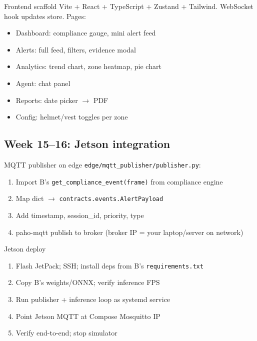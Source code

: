 \documentclass[12pt,a4paper]{report}
\begin{document}
\begin{stepbox}{Frontend scaffold}
Vite + React + TypeScript + Zustand + Tailwind. WebSocket hook updates store. Pages:
\begin{itemize}
    \item Dashboard: compliance gauge, mini alert feed
    \item Alerts: full feed, filters, evidence modal
    \item Analytics: trend chart, zone heatmap, pie chart
    \item Agent: chat panel
    \item Reports: date picker $\rightarrow$ PDF
    \item Config: helmet/vest toggles per zone
\end{itemize}
\end{stepbox}

\subsection{Week 15--16: Jetson integration}

\begin{stepbox}{MQTT publisher on edge}
\texttt{edge/mqtt\_publisher/publisher.py}:
\begin{enumerate}
    \item Import B's \texttt{get\_compliance\_event(frame)} from compliance engine
    \item Map dict $\rightarrow$ \texttt{contracts.events.AlertPayload}
    \item Add timestamp, session\_id, priority, type
    \item paho-mqtt publish to broker (broker IP = your laptop/server on network)
\end{enumerate}
\end{stepbox}

\begin{stepbox}{Jetson deploy}
\begin{enumerate}
    \item Flash JetPack; SSH; install deps from B's \texttt{requirements.txt}
    \item Copy B's weights/ONNX; verify inference FPS
    \item Run publisher + inference loop as systemd service
    \item Point Jetson MQTT at Compose Mosquitto IP
    \item Verify end-to-end; stop simulator
\end{enumerate}
\end{stepbox}
\end{document}
